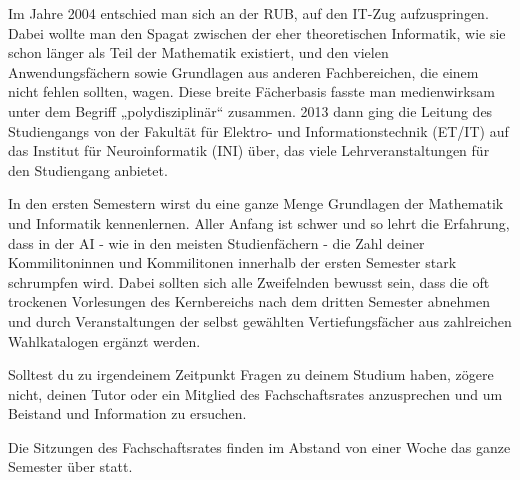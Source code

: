 Im Jahre 2004 entschied man sich an der RUB, auf den IT-Zug aufzuspringen. Dabei wollte man den Spagat zwischen der eher theoretischen Informatik, wie sie schon länger als Teil der Mathematik existiert, und den vielen Anwendungsfächern sowie Grundlagen aus anderen Fachbereichen, die einem nicht fehlen sollten, wagen. Diese breite Fächerbasis fasste man medienwirksam unter dem Begriff „polydisziplinär“ zusammen. 2013 dann ging die Leitung des Studiengangs von der Fakultät für Elektro- und Informationstechnik (ET/IT) auf das Institut für Neuroinformatik (INI) über, das viele Lehrveranstaltungen für den Studiengang anbietet.

In den ersten Semestern wirst du eine ganze Menge Grundlagen der Mathematik und Informatik kennenlernen. Aller Anfang ist schwer und so lehrt die Erfahrung, dass in der AI - wie in den meisten Studienfächern - die Zahl deiner Kommilitoninnen und Kommilitonen innerhalb der ersten Semester stark schrumpfen wird. Dabei sollten sich alle Zweifelnden bewusst sein, dass die oft trockenen Vorlesungen des Kernbereichs nach dem dritten Semester abnehmen und durch Veranstaltungen der selbst gewählten Vertiefungsfächer aus zahlreichen Wahlkatalogen ergänzt werden.

Solltest du zu irgendeinem Zeitpunkt Fragen zu deinem Studium haben, zögere nicht, deinen Tutor oder ein Mitglied des Fachschaftsrates anzusprechen und um Beistand und Information zu ersuchen.

Die Sitzungen des Fachschaftsrates finden im Abstand von einer Woche das ganze Semester über statt.